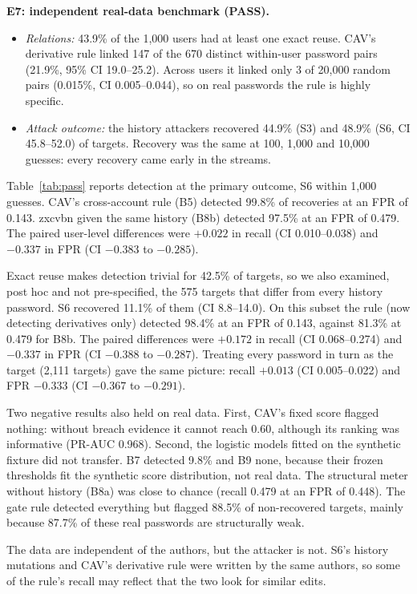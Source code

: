 \documentclass[preprint,12pt]{elsarticle}
\begin{document}
\textbf{E7: independent real-data benchmark (PASS).} 
\begin{itemize}
\item \emph{Relations:} 43.9\% of the 1,000 users had at least one exact reuse. CAV's derivative rule linked 147 of the 670 distinct within-user password pairs (21.9\%, 95\% CI 19.0--25.2). Across users it linked only 3 of 20,000 random pairs (0.015\%, CI 0.005--0.044), so on real passwords the rule is highly specific.
\item \emph{Attack outcome:} the history attackers recovered 44.9\% (S3) and 48.9\% (S6, CI 45.8--52.0) of targets. Recovery was the same at 100, 1,000 and 10,000 guesses: every recovery came early in the streams.
\end{itemize}
Table~\ref{tab:pass} reports detection at the primary outcome, S6 within 1,000 guesses. CAV's cross-account rule (B5) detected 99.8\% of recoveries at an FPR of 0.143. zxcvbn given the same history (B8b) detected 97.5\% at an FPR of 0.479. The paired user-level differences were $+0.022$ in recall (CI 0.010--0.038) and $-0.337$ in FPR (CI $-0.383$ to $-0.285$).

Exact reuse makes detection trivial for 42.5\% of targets, so we also examined, post hoc and not pre-specified, the 575 targets that differ from every history password. S6 recovered 11.1\% of them (CI 8.8--14.0). On this subset the rule (now detecting derivatives only) detected 98.4\% at an FPR of 0.143, against 81.3\% at 0.479 for B8b. The paired differences were $+0.172$ in recall (CI 0.068--0.274) and $-0.337$ in FPR (CI $-0.388$ to $-0.287$). Treating every password in turn as the target (2,111 targets) gave the same picture: recall $+0.013$ (CI 0.005--0.022) and FPR $-0.333$ (CI $-0.367$ to $-0.291$).

Two negative results also held on real data. First, CAV's fixed score flagged nothing: without breach evidence it cannot reach 0.60, although its ranking was informative (PR-AUC 0.968). Second, the logistic models fitted on the synthetic fixture did not transfer. B7 detected 9.8\% and B9 none, because their frozen thresholds fit the synthetic score distribution, not real data. The structural meter without history (B8a) was close to chance (recall 0.479 at an FPR of 0.448). The gate rule detected everything but flagged 88.5\% of non-recovered targets, mainly because 87.7\% of these real passwords are structurally weak.

The data are independent of the authors, but the attacker is not. S6's history mutations and CAV's derivative rule were written by the same authors, so some of the rule's recall may reflect that the two look for similar edits.
\end{document}
